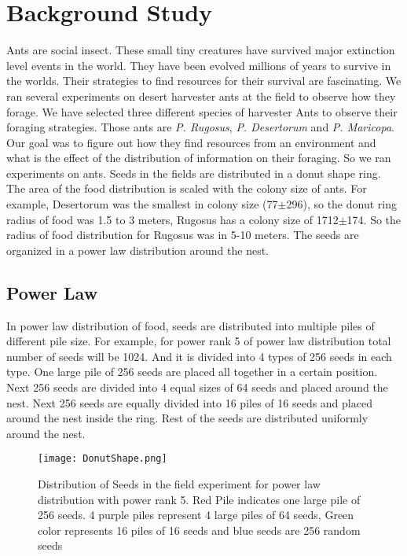 \chapter{Background Study}
Ants are social insect. These small tiny creatures have survived major extinction level events in the world. They have been evolved millions of years to survive in the worlds. Their strategies to find resources for their survival are fascinating. We ran several experiments on desert harvester ants at the field to observe how they forage. We have selected three different species of harvester Ants to observe their foraging strategies. Those ants are \textit{P. Rugosus}, \textit{P. Desertorum} and \textit{P. Maricopa}. Our goal was to figure out how they find resources from an environment and what is the effect of the distribution of information on their foraging. So we ran experiments on ants. Seeds in the fields are distributed in a donut shape ring. The area of the food distribution is scaled with the colony size of ants. For example, Desertorum was the smallest in colony size (77$\pm$296), so the donut ring radius of food was 1.5 to 3 meters, Rugosus has a colony size of 1712$\pm$174. So the radius of food distribution for Rugosus was in 5-10 meters. The seeds are organized in a power law distribution around the nest.
\section{\label{section:Power Law}Power Law}
In power law distribution of food, seeds are distributed into multiple piles of different pile size. For example, for power rank 5 of power law distribution total number of seeds will be 1024. And it is divided into 4 types of 256 seeds in each type. One large pile of 256 seeds are placed all together in a certain position. Next 256 seeds are divided into 4 equal sizes of 64 seeds and placed around the nest. Next 256 seeds are equally divided into 16 piles of 16 seeds and placed around the nest inside the ring. Rest of the seeds are distributed uniformly around the nest.
\begin{figure}[h]
	\texttt{[image: DonutShape.png]}
	\caption{Distribution of Seeds in the field experiment for power law distribution with power rank 5. Red Pile indicates one large pile of 256 seeds. 4 purple piles represent 4 large piles of 64 seeds, Green color represents 16 piles of 16 seeds and blue seeds are 256 random seeds}
\end{figure}
